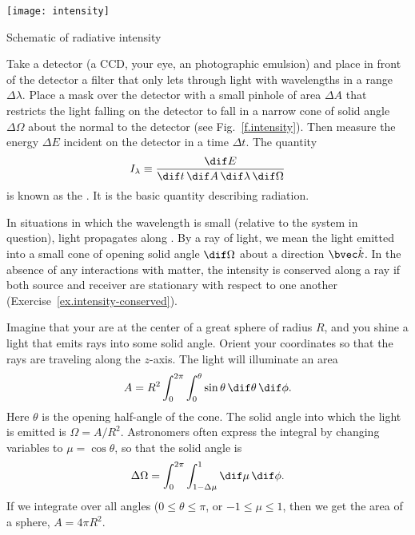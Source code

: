 \begin{marginfigure}[6\baselineskip]
\texttt{[image: intensity]}
\caption{\label{f.intensity} Schematic of radiative intensity}
\end{marginfigure}
Take a detector (a CCD, your eye, an photographic emulsion) and place in front of the detector a filter that only lets through light with wavelengths in a range $\Delta\lambda$. Place a mask over the detector with a small pinhole of area $\Delta A$ that restricts the light falling on the detector to fall in a narrow cone of solid angle $\Delta\Omega$ about the normal to the detector (see Fig.~\ref{f.intensity}). Then measure the energy $\Delta E$ incident on the detector in a time $\Delta t$. The quantity
\begin{equation}\label{e.definition-intensity}
I_{\lambda} \equiv \frac{\dif E}{\dif t\,\dif A\,\dif\lambda\,\dif\Omega}
\end{equation}
is known as the . It is the basic quantity describing radiation.

In situations in which the wavelength is small (relative to the system in question), light propagates along . By a ray of light, we mean the light emitted into a small cone of opening solid angle $\dif\Omega$ about a direction $\unitk$. In the absence of any interactions with matter, the intensity is conserved along a ray if both source and receiver are stationary with respect to one another (Exercise~\ref{ex.intensity-conserved}).

\begin{sidebar}
\label{sb.solid-angles}
Imagine that your are at the center of a great sphere of radius $R$, and you shine a light that emits rays into some solid angle. Orient your coordinates so that the rays are traveling along the $z$-axis. The light will illuminate an area
\[ 	A = R^{2}\int_{0}^{2\pi}\int_{0}^{\theta}\sin\theta\,\dif\theta\,\dif\phi. \]
Here $\theta$ is the opening half-angle of the cone. The solid angle into which the light is emitted is $\Omega = A/R^{2}$. Astronomers often express the integral by changing variables to $\mu = \cos\theta$, so that the solid angle is
\[
	\Delta\Omega = \int_{0}^{2\pi}\int_{1-\Delta\mu}^{1}\dif\mu\,\dif\phi.
\]
If we integrate over all angles ($0\le\theta\le\pi$, or $-1\le\mu\le 1$, then we get the area of a sphere, $A = 4\pi R^{2}$.
\end{sidebar}

